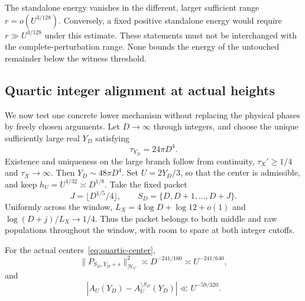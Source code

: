 The standalone energy vanishes in the different, larger sufficient
range $r=o(U^{3/128})$. Conversely, a fixed positive standalone energy
would require $r\gg U^{3/128}$ under this estimate.
These statements must not be interchanged with the complete-perturbation
range. None bounds the energy of the untouched remainder below the
witness threshold.

\subsection{Quartic integer alignment at actual heights}

We now test one concrete lower mechanism without replacing the physical
phases by freely chosen arguments. Let $D\to\infty$ through integers,
and choose the unique sufficiently large real $Y_D$ satisfying
\begin{equation}\label{eq:quartic-center}
 \tau_{Y_D}=24\pi D^4.
\end{equation}
Existence and uniqueness on the large branch follow from continuity,
$\tau_X'\ge1/4$ and $\tau_X\to\infty$.
Then $Y_D\sim48\pi D^4$. Set $U=2Y_D/3$, so that the center is
admissible, and keep $h_U=U^{1/32}\asymp D^{1/8}$.
Take the fixed packet
\[
 J=\lfloor D^{1/5}/4\rfloor,\qquad S_D=\{D,D+1,\ldots,D+J\}.
\]
Uniformly across the window, $L_X=4\log D+\log12+o(1)$ and
$\log(D+j)/L_X\to1/4$. Thus the packet belongs to both middle and
raw populations throughout the window, with room to spare at both
integer cutoffs.

\begin{theorem}\label{thm:quartic}
For the actual centers~\eqref{eq:quartic-center},
\begin{equation}\label{eq:quartic-energy}
 \|P_{S_D,Y_D+s}\|_{\mathcal H_U}^2
 \asymp D^{-241/160}\asymp U^{-241/640},
\end{equation}
and
\begin{equation}\label{eq:quartic-full}
 |A_U(Y_D)-A_U^{\setminus S_D}(Y_D)|\ll U^{-59/320}.
\end{equation}
\end{theorem}

